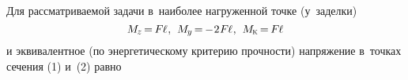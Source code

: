\documentclass[14pt]{extarticle}
\begin{document}
Для рассматриваемой задачи в~наиболее нагруженной точке (у~заделки)
\[
M_{\hspace{-0.1ex}\scalebox{.8}{$z$}} \hspace{-.25ex}
= \hspace{-.2ex} F \hspace{-0.1ex} \ell
\hspace{.1ex} , \hspace{.4em}
M_{\hspace{-0.1ex}\scalebox{.8}{$y$}} \hspace{-.25ex}
= \hspace{-.2ex} - \hspace{.1ex} 2 \hspace{.1ex} F \hspace{-0.1ex} \ell
\hspace{.1ex} , \hspace{.4em}
M_{\hspace{-0.1ex}\mathrm{\scalebox{.6}{K}}} \hspace{-.25ex}
= \hspace{-.2ex} F \hspace{-0.1ex} \ell
\]
и эквивалентное (по энергетическому критерию прочности) напряжение в~точках сечения (1) и~(2) равно
\end{document}
